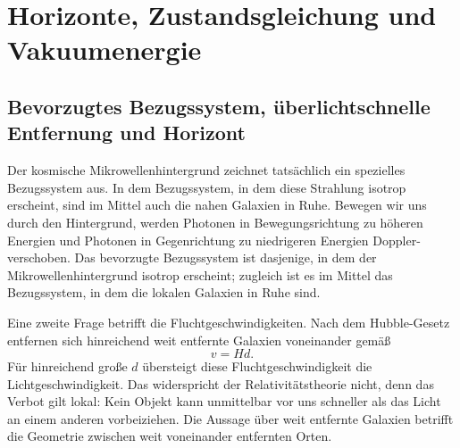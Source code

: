 \chapter{Horizonte, Zustandsgleichung und Vakuumenergie}

\section{Bevorzugtes Bezugssystem, überlichtschnelle Entfernung und Horizont}

Der kosmische Mikrowellenhintergrund zeichnet tatsächlich ein spezielles Bezugssystem aus. In dem Bezugssystem, in dem diese Strahlung isotrop erscheint, sind im Mittel auch die nahen Galaxien in Ruhe. Bewegen wir uns durch den Hintergrund, werden Photonen in Bewegungsrichtung zu höheren Energien und Photonen in Gegenrichtung zu niedrigeren Energien Doppler-verschoben. Das bevorzugte Bezugssystem ist dasjenige, in dem der Mikrowellenhintergrund isotrop erscheint; zugleich ist es im Mittel das Bezugssystem, in dem die lokalen Galaxien in Ruhe sind.

\begin{classroomqa}\end{classroomqa}

Eine zweite Frage betrifft die Fluchtgeschwindigkeiten. Nach dem Hubble-Gesetz entfernen sich hinreichend weit entfernte Galaxien voneinander gemäß
\begin{equation}
v = H d .
\end{equation}
Für hinreichend große \(d\) übersteigt diese Fluchtgeschwindigkeit die Lichtgeschwindigkeit. Das widerspricht der Relativitätstheorie nicht, denn das Verbot gilt lokal: Kein Objekt kann unmittelbar vor uns schneller als das Licht an einem anderen vorbeiziehen. Die Aussage über weit entfernte Galaxien betrifft die Geometrie zwischen weit voneinander entfernten Orten.

\begin{classroomqa}\end{classroomqa}

